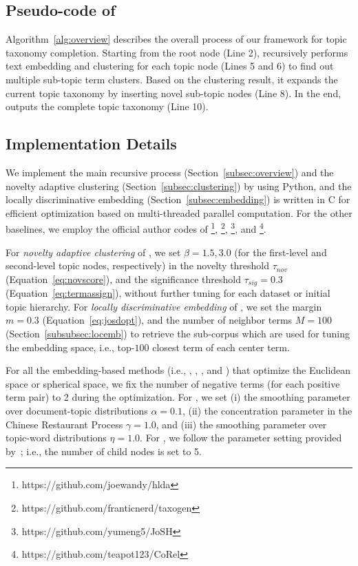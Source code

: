 \subsection{Pseudo-code of \proposed}
\label{subsec:pseudocode}
Algorithm~\ref{alg:overview} describes the overall process of our framework for topic taxonomy completion.
Starting from the root node (Line 2), \proposed recursively performs text embedding and clustering for each topic node (Lines 5 and 6) to find out multiple sub-topic term clusters.
Based on the clustering result, it expands the current topic taxonomy by inserting novel sub-topic nodes (Line 8).
In the end, \proposed outputs the complete topic taxonomy (Line 10).


\subsection{Implementation Details}
\label{subsec:impdetail}
We implement the main recursive process (Section~\ref{subsec:overview}) and the novelty adaptive clustering (Section~\ref{subsec:clustering}) by using Python,
and the locally discriminative embedding (Section~\ref{subsec:embedding}) is written in C for efficient optimization based on multi-threaded parallel computation.
For the other baselines, we employ the official author codes of \hlda\footnote{https://github.com/joewandy/hlda}, \taxogen\footnote{https://github.com/franticnerd/taxogen}, \josh\footnote{https://github.com/yumeng5/JoSH}, and \corel\footnote{https://github.com/teapot123/CoRel}.

For \textit{novelty adaptive clustering} of \proposed, we set $\beta=1.5, 3.0$ (for the first-level and second-level topic nodes, respectively) in the novelty threshold $\tau_{nov}$ (Equation~\eqref{eq:novscore}), and the significance threshold $\tau_{sig}=0.3$ (Equation~\eqref{eq:termassign}),
without further tuning for each dataset or initial topic hierarchy.
For \textit{locally discriminative embedding} of \proposed, we set the margin $m=0.3$ (Equation~\eqref{eq:josdopt}), and the number of neighbor terms $M=100$ (Section~\ref{subsubsec:locemb}) to retrieve the sub-corpus which are used for tuning the embedding space, i.e., top-$100$ closest term of each center term.

For all the embedding-based methods (i.e., \taxogen, \josh, \corel, and \proposed) that optimize the Euclidean space or spherical space, we fix the number of negative terms (for each positive term pair) to 2 during the optimization.
For \hlda, we set (i) the smoothing parameter over document-topic distributions $\alpha=0.1$, (ii) the concentration parameter in the Chinese Restaurant Process $\gamma=1.0$, and (iii) the smoothing parameter over topic-word distributions $\eta=1.0$.
For \taxogen, we follow the parameter setting provided by~\cite{zhang2018taxogen};
i.e., the number of child nodes is set to 5.


